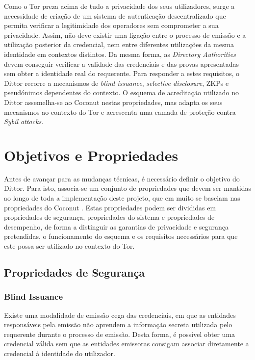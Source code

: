 Como o Tor preza acima de tudo a privacidade dos seus utilizadores, surge a necessidade de criação de um sistema de autenticação descentralizado que permita verificar a legitimidade dos operadores sem comprometer a sua privacidade. Assim, não deve existir uma ligação entre o processo de emissão e a utilização posterior da credencial, nem entre diferentes utilizações da mesma identidade em contextos distintos. Da mesma forma, as \textit{Directory Authorities} devem conseguir verificar a validade das credenciais e das provas apresentadas sem obter a identidade real do requerente. Para responder a estes requisitos, o Dittor recorre a mecanismos de \textit{blind issuance}, \textit{selective disclosure}, ZKPs e pseudónimos dependentes do contexto. O esquema de acreditação utilizado no Dittor assemelha-se ao Coconut nestas propriedades, mas adapta os seus mecanismos ao contexto do Tor e acrescenta uma camada de proteção contra \textit{Sybil attacks}.

\section{Objetivos e Propriedades}
\label{sec:dittor_objetivos_propriedades}

Antes de avançar para as mudanças técnicas, é necessário definir o objetivo do Dittor. Para isto, associa-se um conjunto de propriedades que devem ser mantidas ao longo de toda a implementação deste projeto, que em muito se baseiam nas propriedades do Coconut \cite{sonnino2018coconut}. Estas propriedades podem ser divididas em propriedades de segurança, propriedades do sistema e propriedades de desempenho, de forma a distinguir as garantias de privacidade e segurança pretendidas, o funcionamento do esquema e os requisitos necessários para que este possa ser utilizado no contexto do Tor.

\subsection{Propriedades de Segurança}
\label{sub:dittor_propriedades_seguranca}

\subsubsection{Blind Issuance}

Existe uma modalidade de emissão cega das credenciais, em que as entidades responsáveis pela emissão não aprendem a informação secreta utilizada pelo requerente durante o processo de emissão. Desta forma, é possível obter uma credencial válida sem que as entidades emissoras consigam associar diretamente a credencial à identidade do utilizador.

